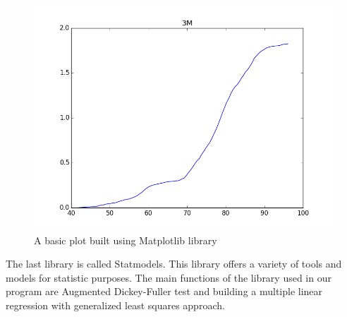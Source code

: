 \documentclass[
  twoside,
  11pt, a4paper,
  footinclude=true,
  headinclude=true,
  cleardoublepage=empty
]{scrreprt}
\begin{document}
    \begin{figure}[H]
        \includegraphics[scale=0.5]{PythonPlotExample.png}
        \centering
        \caption{A basic plot built using Matplotlib library}
        \label{fig:PythonPlotExample}
    \end{figure}
    
    The last library is called Statmodels. This library offers a variety of tools and models for statistic purposes. The main functions of the library used in our program are Augmented Dickey-Fuller test and building a multiple linear regression with generalized least squares approach.\\
    
\end{document}
